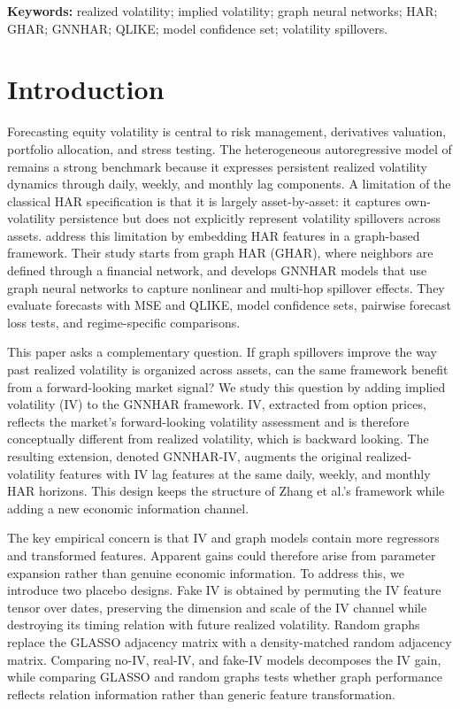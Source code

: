 \documentclass[11pt,a4paper]{article}
\begin{document}
\noindent\begin{minipage}{\textwidth}
\textbf{Keywords:} realized volatility; implied volatility; graph neural networks; HAR; GHAR;
GNNHAR; QLIKE; model confidence set; volatility spillovers.
\end{minipage}

\section{Introduction}

Forecasting equity volatility is central to risk management, derivatives valuation, portfolio
allocation, and stress testing. The heterogeneous autoregressive model of \citet{corsi2009har}
remains a strong benchmark because it expresses persistent realized volatility dynamics through
daily, weekly, and monthly lag components. A limitation of the classical HAR specification is
that it is largely asset-by-asset: it captures own-volatility persistence but does not explicitly
represent volatility spillovers across assets. \citet{zhang2025gnnhar} address this limitation by
embedding HAR features in a graph-based framework. Their study starts from graph HAR
(GHAR), where neighbors are defined through a financial network, and develops GNNHAR
models that use graph neural networks to capture nonlinear and multi-hop spillover effects.
They evaluate forecasts with MSE and QLIKE, model confidence sets, pairwise forecast loss
tests, and regime-specific comparisons.

This paper asks a complementary question. If graph spillovers improve the way past realized
volatility is organized across assets, can the same framework benefit from a forward-looking
market signal? We study this question by adding implied volatility (IV) to the GNNHAR
framework. IV, extracted from option prices, reflects the market's forward-looking volatility
assessment and is therefore conceptually different from realized volatility, which is backward
looking. The resulting extension, denoted GNNHAR-IV, augments the original realized-volatility
features with IV lag features at the same daily, weekly, and monthly HAR horizons. This design
keeps the structure of Zhang et al.'s framework while adding a new economic information
channel.

The key empirical concern is that IV and graph models contain more regressors and transformed
features. Apparent gains could therefore arise from parameter expansion rather than genuine
economic information. To address this, we introduce two placebo designs. Fake IV is obtained
by permuting the IV feature tensor over dates, preserving the dimension and scale of the IV
channel while destroying its timing relation with future realized volatility. Random graphs
replace the GLASSO adjacency matrix with a density-matched random adjacency matrix. Comparing
no-IV, real-IV, and fake-IV models decomposes the IV gain, while comparing GLASSO and random
graphs tests whether graph performance reflects relation information rather than generic
feature transformation.
\end{document}
